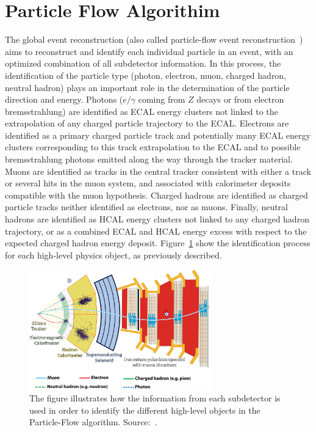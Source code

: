 
\section{Particle Flow Algorithim}

The global event reconstruction (also called particle-flow event reconstruction~\cite{CMS-PRF-14-001}) aims to reconstruct and identify each individual particle in an event, with an optimized combination of all subdetector information. In this process, the identification of the particle type (photon, electron, muon, charged hadron, neutral hadron) plays an important role in the determination of the particle direction and energy. Photons ($e/\gamma$ coming from $Z$ decays or from electron bremsstrahlung) are identified as ECAL energy clusters not linked to the extrapolation of any charged particle trajectory to the ECAL. Electrons are identified as a primary charged particle track and potentially many ECAL energy clusters corresponding to this track extrapolation to the ECAL and to possible bremsstrahlung photons emitted along the way through the tracker material. Muons are identified as tracks in the central tracker consistent with either a track or several hits in the muon system, and associated with calorimeter deposits compatible with the muon hypothesis. Charged hadrons are identified as charged particle tracks neither identified as electrons, nor as muons. Finally, neutral hadrons are identified as HCAL energy clusters not linked to any charged hadron trajectory, or as a combined ECAL and HCAL energy excess with respect to the expected charged hadron energy deposit. Figure~\ref{cms_particle_flow} show the identification process for each high-level physics object, as previously described.


\begin{figure}[htbp]
    \centering
    \includegraphics[width=0.7\textwidth]{figures_and_tables/experimental_setup/particle_flow.png}
    \caption{The figure illustrates how the information from each subdetector is used in order to identify the different high-level objects in the Particle-Flow algorithm. Source:~\cite{CMS-PRF-14-001}.}
    \label{cms_particle_flow}
\end{figure}

